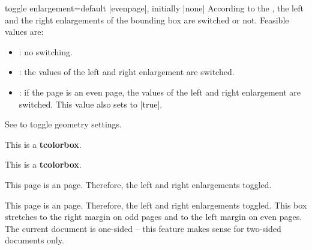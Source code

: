 \clearpage
\begin{docTcbKey}[][doc updated=2015-11-13]{toggle enlargement}{=}{default |evenpage|, initially |none|}
  According to the , the left and the right enlargements of
  the bounding box are switched or not. Feasible values are:
  \begin{itemize}
  \item{}: no switching.
  \item{}: the values of the left and right enlargement are switched.
  \item{}: if the page is an even page, the values of the left and
    right enlargement are switched. This value also sets
     to |true|.
  \end{itemize}
\begin{marker}
See  to toggle geometry settings.
\end{marker}

\begin{dispExample}

\begin{tcolorbox}[toggle enlargement=none,enhanced,show bounding box]
This is a \textbf{tcolorbox}.
\end{tcolorbox}
\begin{tcolorbox}[toggle enlargement=forced]
This is a \textbf{tcolorbox}.
\end{tcolorbox}
\begin{tcolorbox}[toggle enlargement=evenpage]
  This page is an  page.
  Therefore, the left and right enlargements
   toggled.
\end{tcolorbox}
\end{dispExample}

\begin{dispListing}
\begin{tcolorbox}[colframe=red!60!black,colback=red!15!white,
  fonttitle=\bfseries,title=Floating box from \texttt{toggle enlargement},
  width=\textwidth,grow to right by=2cm,toggle enlargement,float=t]
  This page is an  page.
  Therefore, the left and right enlargements  toggled.
  This box stretches to the right margin on odd pages and to the left
  margin on even pages. The current document is one-sided -- this feature makes
  sense for two-sided documents only.
\end{tcolorbox}
\end{dispListing}
\tcbusetemp
\end{docTcbKey}


